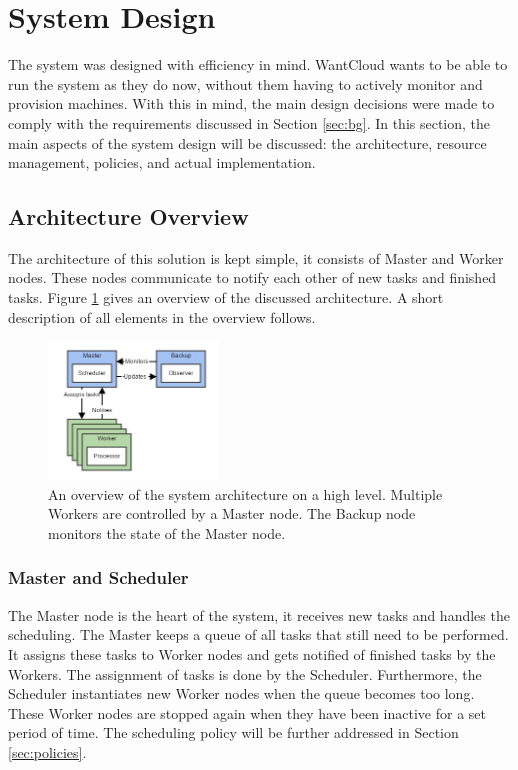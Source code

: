 \documentclass{acm_proc_article-sp}
\begin{document}
\section{System Design}
\label{sec:system}
The system was designed with efficiency in mind.
WantCloud wants to be able to run the system as they do now, without them having to actively monitor and provision machines.
With this in mind, the main design decisions were made to comply with the requirements discussed in Section \ref{sec:bg}.
In this section, the main aspects of the system design will be discussed: the architecture, resource management, policies, and actual implementation.

\subsection{Architecture Overview}
The architecture of this solution is kept simple, it consists of Master and Worker nodes.
These nodes communicate to notify each other of new tasks and finished tasks.
Figure \ref{fig:architecture_overview} gives an overview of the discussed architecture.
A short description of all elements in the overview follows.

\begin{figure}
	\centering
	\includegraphics[width=0.4\textwidth]{images/architecture_overview.jpg}
	\caption{An overview of the system architecture on a high level. Multiple Workers are controlled by a Master node. The Backup node monitors the state of the Master node.}
	\label{fig:architecture_overview}
\end{figure}

\subsubsection{Master and Scheduler}
The Master node is the heart of the system, it receives new tasks and handles the scheduling.
The Master keeps a queue of all tasks that still need to be performed.
It assigns these tasks to Worker nodes and gets notified of finished tasks by the Workers.
The assignment of tasks is done by the Scheduler.
Furthermore, the Scheduler instantiates new Worker nodes when the queue becomes too long.
These Worker nodes are stopped again when they have been inactive for a set period of time.
The scheduling policy will be further addressed in Section \ref{sec:policies}.
\end{document}
